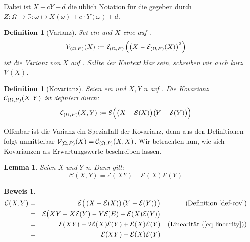 \documentclass[a4paper]{article}
\newtheorem{lemma}[satz]{Lemma}
\newtheorem{definition}[satz]{Definition} %
\theoremstyle{nonumberplain}
\newtheorem{beweis}{Beweis}
\begin{document}
Dabei ist  $X + cY + d$ die üblich Notation für die \rvar{} gegeben durch $Z : \Omega \to \mathbb{R} : \omega \mapsto X(\omega) + c \cdot Y(\omega)+ d$.
\newcommand{\var}{Varianz}
\begin{definition}[\var]\label{def-var}
	Sei \probspaceex{} ein \probspace{} und $X$ eine \rvar{} auf \probspaceex{}.
	\begin{equation}
		\mathcal{V}_{(\Omega, P){}}(X) :=  \mathcal{E}_{(\Omega, P){}}\left(\left(X - \mathcal{E}_{(\Omega, P){}} (X)\right)^{2}\right)
	\end{equation}
	ist die \var{} von $X$ auf  \probspaceex{}. Sollte der Kontext \probspaceex{} klar sein, schreiben wir auch kurz $\mathcal{V}(X)$.
\end{definition}
\newcommand{\cov}{Kovarianz}
\begin{definition}[\cov]\label{def-cov}
	Seien \probspaceex{} ein \probspace{} und $X, Y$ \rvar n auf \probspaceex{}. Die Kovarianz $\mathcal{C}_{(\Omega, P)}(X,Y)$ ist definiert durch:
	\begin{equation}
		\mathcal{C}_{(\Omega, P)}(X,Y) := \mathcal{E} \Big( \big(X - \mathcal{E}(X)\big)\big(Y - \mathcal{E}(Y) \big)\Big)
	\end{equation}
\end{definition}

Offenbar ist die \var{} ein Spezialfall der \cov{}, denn aus den Definitionen folgt unmittelbar $\mathcal{V}_{(\Omega, P)}(X) = \mathcal{C}_{(\Omega, P)}(X,X)$. Wir betrachten nun, wie sich Kovarianzen als Erwartungswerte beschreiben lassen.

\begin{lemma}\label{lemma-cov-exp}
	Seien $X$ und $Y$ \rvar{}n. Dann gilt:
\begin{equation}
	\mathcal{C}(X,Y) = \mathcal{E}(XY) - \mathcal{E}(X)\mathcal{E}(Y)
\end{equation}
\end{lemma}
\begin{beweis}
\begin{align*}
\mathcal{C}(X,Y) & = & \mathcal{E}\big( \left(X - \mathcal{E}(X)\right)\left(Y - \mathcal{E}(Y)\right)\big) && \text{(Definition \ref{def-cov})} \\
& = & \mathcal{E}\big(XY - X \mathcal{E}(Y) - Y \mathcal{E}(E) + \mathcal{E}(X)\mathcal{E}(Y)\big) \\
& = & \mathcal{E}(XY) - 2 \mathcal{E}(X) \mathcal{E}(Y) + \mathcal{E}(X) \mathcal{E}(Y) && \text{(Linearität (\ref{eq-linearity}))}\\
& = & \mathcal{E}(XY) - \mathcal{E}(X)\mathcal{E}(Y) \\
\end{align*}
\end{beweis}
\end{document}
